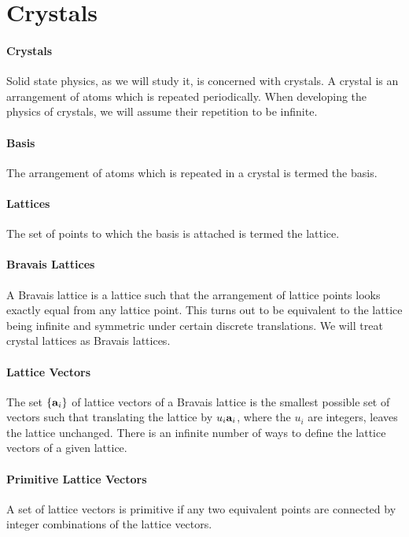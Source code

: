 \section{Crystals}

\paragraph{Crystals}
Solid state physics, as we will study it, is concerned with crystals. A crystal is an arrangement of atoms which is repeated periodically. When developing the physics of crystals, we will assume their repetition to be infinite.

\paragraph{Basis}
The arrangement of atoms which is repeated in a crystal is termed the basis.

\paragraph{Lattices}
The set of points to which the basis is attached is termed the lattice.

\paragraph{Bravais Lattices}
A Bravais lattice is a lattice such that the arrangement of lattice points looks exactly equal from any lattice point. This turns out to be equivalent to the lattice being infinite and symmetric under certain discrete translations. We will treat crystal lattices as Bravais lattices.


\paragraph{Lattice Vectors}
The set $\{\vb{a}_{i}\}$ of lattice vectors of a Bravais lattice is the smallest possible set of vectors such that translating the lattice by $u_{i}\vb{a}_{i}$, where the $u_{i}$ are integers, leaves the lattice unchanged. There is an infinite number of ways to define the lattice vectors of a given lattice.

\paragraph{Primitive Lattice Vectors}
A set of lattice vectors is primitive if any two equivalent points are connected by integer combinations of the lattice vectors.

